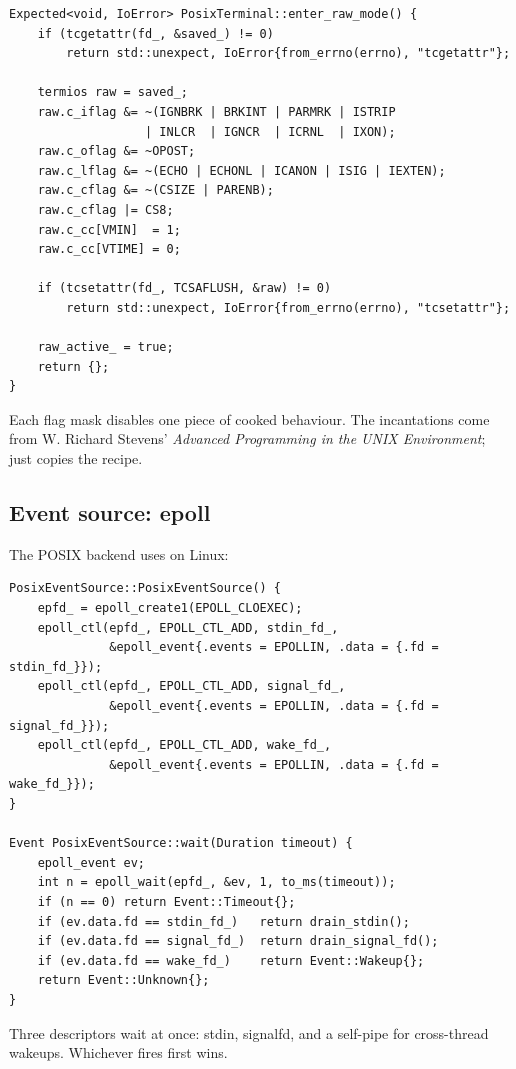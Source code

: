 \begin{lstlisting}
Expected<void, IoError> PosixTerminal::enter_raw_mode() {
    if (tcgetattr(fd_, &saved_) != 0)
        return std::unexpect, IoError{from_errno(errno), "tcgetattr"};

    termios raw = saved_;
    raw.c_iflag &= ~(IGNBRK | BRKINT | PARMRK | ISTRIP
                   | INLCR  | IGNCR  | ICRNL  | IXON);
    raw.c_oflag &= ~OPOST;
    raw.c_lflag &= ~(ECHO | ECHONL | ICANON | ISIG | IEXTEN);
    raw.c_cflag &= ~(CSIZE | PARENB);
    raw.c_cflag |= CS8;
    raw.c_cc[VMIN]  = 1;
    raw.c_cc[VTIME] = 0;

    if (tcsetattr(fd_, TCSAFLUSH, &raw) != 0)
        return std::unexpect, IoError{from_errno(errno), "tcsetattr"};

    raw_active_ = true;
    return {};
}
\end{lstlisting}

Each flag mask disables one piece of cooked behaviour. The
incantations come from W. Richard Stevens' \emph{Advanced
Programming in the UNIX Environment}; \maya{} just copies the
recipe.

\subsection*{Event source: epoll}

The POSIX backend uses  on Linux:

\begin{lstlisting}
PosixEventSource::PosixEventSource() {
    epfd_ = epoll_create1(EPOLL_CLOEXEC);
    epoll_ctl(epfd_, EPOLL_CTL_ADD, stdin_fd_,
              &epoll_event{.events = EPOLLIN, .data = {.fd = stdin_fd_}});
    epoll_ctl(epfd_, EPOLL_CTL_ADD, signal_fd_,
              &epoll_event{.events = EPOLLIN, .data = {.fd = signal_fd_}});
    epoll_ctl(epfd_, EPOLL_CTL_ADD, wake_fd_,
              &epoll_event{.events = EPOLLIN, .data = {.fd = wake_fd_}});
}

Event PosixEventSource::wait(Duration timeout) {
    epoll_event ev;
    int n = epoll_wait(epfd_, &ev, 1, to_ms(timeout));
    if (n == 0) return Event::Timeout{};
    if (ev.data.fd == stdin_fd_)   return drain_stdin();
    if (ev.data.fd == signal_fd_)  return drain_signal_fd();
    if (ev.data.fd == wake_fd_)    return Event::Wakeup{};
    return Event::Unknown{};
}
\end{lstlisting}

Three descriptors wait at once: stdin, signalfd, and a self-pipe
for cross-thread wakeups. Whichever fires first wins.

